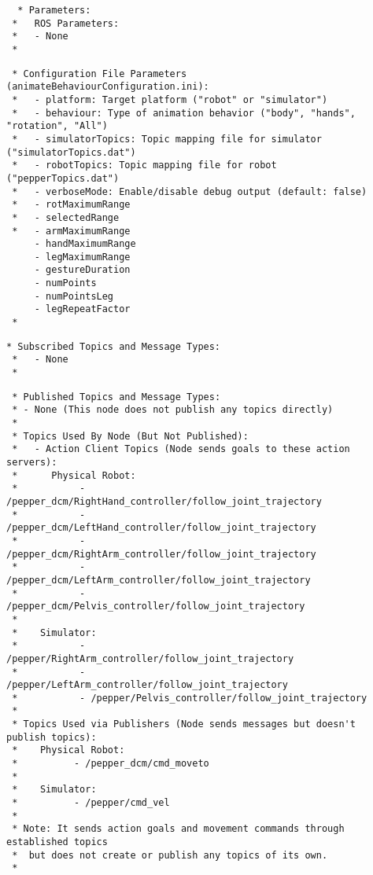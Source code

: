 \documentclass{CSSRforAfrica}
\newcommand{\checkboxChecked}{\fbox{\ding{51}}} %
\begin{document}
\begin{description}
\item[\checkboxChecked] 
 {\small 
\begin{verbatim}
  * Parameters:
 *   ROS Parameters:
 *   - None
 * 
\end{verbatim}}

\item[\checkboxChecked] 
 {\small 
\begin{verbatim}
 * Configuration File Parameters (animateBehaviourConfiguration.ini):
 *   - platform: Target platform ("robot" or "simulator")
 *   - behaviour: Type of animation behavior ("body", "hands", "rotation", "All")
 *   - simulatorTopics: Topic mapping file for simulator ("simulatorTopics.dat")
 *   - robotTopics: Topic mapping file for robot ("pepperTopics.dat")
 *   - verboseMode: Enable/disable debug output (default: false)  
 *   - rotMaximumRange	 
 *   - selectedRange
 *   - armMaximumRange		
     - handMaximumRange				
     - legMaximumRange				
     - gestureDuration				
     - numPoints						
     - numPointsLeg				
     - legRepeatFactor			
 * 
\end{verbatim}}

\item[\checkboxChecked] 
 {\small 
\begin{verbatim}
* Subscribed Topics and Message Types:
 *   - None
 * 
\end{verbatim}}

\newpage
\item[\checkboxChecked] 
 {\small 
\begin{verbatim}                    
 * Published Topics and Message Types:
 * - None (This node does not publish any topics directly)
 * 
 * Topics Used By Node (But Not Published):
 *   - Action Client Topics (Node sends goals to these action servers):
 *      Physical Robot:
 *           - /pepper_dcm/RightHand_controller/follow_joint_trajectory
 *           - /pepper_dcm/LeftHand_controller/follow_joint_trajectory
 *           - /pepper_dcm/RightArm_controller/follow_joint_trajectory
 *           - /pepper_dcm/LeftArm_controller/follow_joint_trajectory
 *           - /pepper_dcm/Pelvis_controller/follow_joint_trajectory
 * 
 *    Simulator:
 *           - /pepper/RightArm_controller/follow_joint_trajectory
 *           - /pepper/LeftArm_controller/follow_joint_trajectory
 *           - /pepper/Pelvis_controller/follow_joint_trajectory
 * 
 * Topics Used via Publishers (Node sends messages but doesn't publish topics):
 *    Physical Robot:
 *          - /pepper_dcm/cmd_moveto
 * 
 *    Simulator:
 *          - /pepper/cmd_vel
 * 
 * Note: It sends action goals and movement commands through established topics
 *  but does not create or publish any topics of its own.
 * 
\end{verbatim}}


\end{description}
\end{document}
